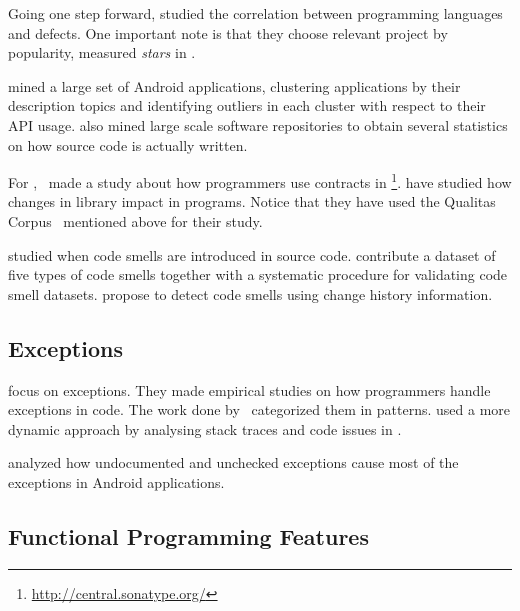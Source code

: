 Going one step forward, \cite{rayLargescaleStudyProgramming2017} studied the correlation between programming languages and defects. 
One important note is that they choose relevant project by popularity, measured \emph{stars} in \github{}.

\cite{gorlaCheckingAppBehavior2014} mined a large set of Android applications, clustering applications by their description topics and identifying outliers in each cluster with respect to their API usage.
\cite{grechanikEmpiricalInvestigationLargescale2010} also mined large scale software repositories to obtain several statistics on how source code is actually written.

For \java{},~\cite{dietrichContractsWildStudy2017a} made a study about how programmers use contracts in \mavencentral{}\footnote{\url{http://central.sonatype.org/}}.
\cite{dietrichBrokenPromisesEmpirical2014} have studied how changes in \api{} library impact in \java{} programs.
Notice that they have used the Qualitas Corpus~\cite{temperoQualitasCorpusCurated2010} mentioned above for their study.

\cite{tufanoWhenWhyYour2015,tufanoWhenWhyYour2017} studied when code smells are introduced in source code.
\cite{palombaLandfillOpenDataset2015}
contribute a dataset of five types of code smells together with a systematic procedure for validating code smell datasets.
\cite{palombaDetectingBadSmells2013} propose to detect code smells using change history information.

\subsection*{Exceptions}

\cite{keryExaminingProgrammerPractices2016,asaduzzamanHowDevelopersUse2016} focus on exceptions.
They made empirical studies on how programmers handle exceptions in \java{} code.
The work done by~\cite{nakshatriAnalysisExceptionHandling2016} categorized them in patterns.
\cite{coelhoUnveilingExceptionHandling2015} used a more dynamic approach by analysing stack traces and code issues in \github{}.

\cite{kechagiaUndocumentedUncheckedExceptions2014} analyzed how undocumented and
unchecked exceptions cause most of the exceptions in
Android applications.

\subsection*{Functional Programming Features}

